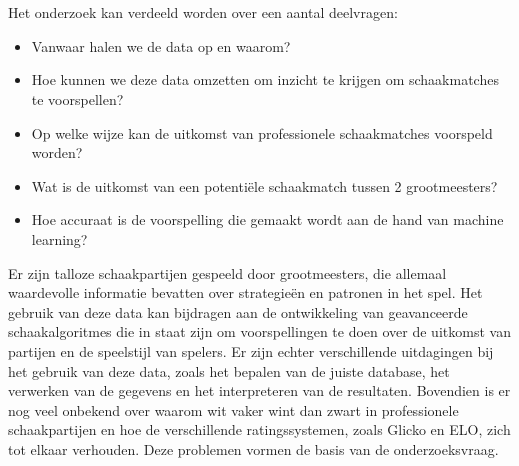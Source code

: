 
\section{}%
\label{sec:onderzoeksvraag}

Het onderzoek kan verdeeld worden over een aantal deelvragen:
\begin{itemize}
    \item Vanwaar halen we de data op en waarom?
    \item Hoe kunnen we deze data omzetten om inzicht te krijgen om schaakmatches te voorspellen?
    \item Op welke wijze kan de uitkomst van professionele schaakmatches voorspeld worden?
    \item Wat is de uitkomst van een potentiële schaakmatch tussen 2 grootmeesters?
    \item Hoe accuraat is de voorspelling die gemaakt wordt aan de hand van machine learning?
\end{itemize}

Er zijn talloze schaakpartijen gespeeld door grootmeesters, die allemaal waardevolle informatie bevatten over strategieën en patronen in het spel. Het gebruik van deze data kan bijdragen aan de ontwikkeling van geavanceerde schaakalgoritmes die in staat zijn om voorspellingen te doen over de uitkomst van partijen en de speelstijl van spelers. Er zijn echter verschillende uitdagingen bij het gebruik van deze data, zoals het bepalen van de juiste database, het verwerken van de gegevens en het interpreteren van de resultaten. Bovendien is er nog veel onbekend over waarom wit vaker wint dan zwart in professionele schaakpartijen en hoe de verschillende ratingssystemen, zoals Glicko en ELO, zich tot elkaar verhouden. Deze problemen vormen de basis van de onderzoeksvraag.


